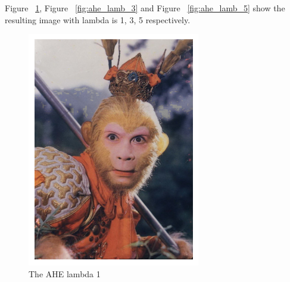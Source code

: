 \documentclass{article}
\begin{document}
	Figure ~\ref{fig:ahe_lamb_1}, Figure ~\ref{fig:ahe_lamb_3} and Figure ~\ref{fig:ahe_lamb_5} show the resulting image with lambda is 1, 3, 5 respectively.
	
	\begin{figure}[!h]
		\includegraphics[width=\linewidth]{img/ahe_lamb_1.png}
		\caption{The AHE lambda 1}
		\label{fig:ahe_lamb_1}
	\end{figure}
	
\end{document}
